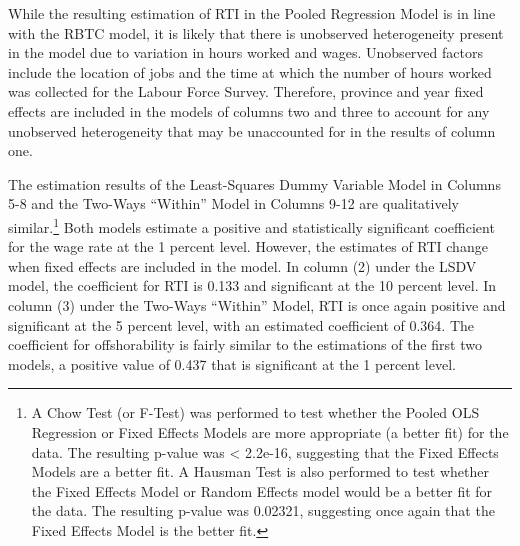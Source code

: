 \documentclass[undefended]{bumrp}
\begin{document}
While the resulting estimation of RTI in the Pooled Regression Model is in line with the RBTC model, it is likely that there is unobserved heterogeneity present in the model due to variation in hours worked and wages. Unobserved factors include the location of jobs and the time at which the number of hours worked was collected for the Labour Force Survey. Therefore, province and year fixed effects are included in the models of columns two and three to account for any unobserved heterogeneity that may be unaccounted for in the results of column one.

The estimation results of the Least-Squares Dummy Variable Model in Columns 5-8 and the Two-Ways “Within” Model in Columns 9-12 are qualitatively similar.\footnote{A Chow Test (or F-Test) was performed to test whether the Pooled OLS Regression or Fixed Effects Models are more appropriate (a better fit) for the data. The resulting p-value was < 2.2e-16, suggesting that the Fixed Effects Models are a better fit. A Hausman Test is also performed to test whether the Fixed Effects Model or Random Effects model would be a better fit for the data. The resulting p-value was 0.02321, suggesting once again that the Fixed Effects Model is the better fit.}  Both models estimate a positive and statistically significant coefficient for the wage rate at the 1 percent level. However, the estimates of RTI change when fixed effects are included in the model. In column (2) under the LSDV model, the coefficient for RTI is 0.133 and significant at the 10 percent level. In column (3) under the Two-Ways “Within” Model, RTI is once again positive and significant at the 5 percent level, with an estimated coefficient of 0.364. The coefficient for offshorability is fairly similar to the estimations of the first two models, a positive value of 0.437 that is significant at the 1 percent level. 
\end{document}
